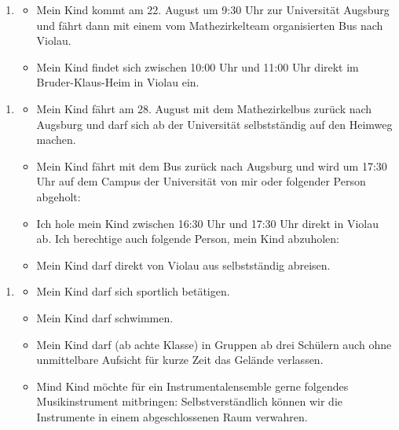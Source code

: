 \documentclass[13pt]{zettel}
\newenvironment{themabox}[1]{%
  \vspace{-0.8em}%
  \begin{enumerate}[labelindent=0pt,labelwidth=2.35cm,itemindent=0em,leftmargin=!,align=left]
    \item[\textbf{#1}]
      \begin{itemize}
}{\end{itemize}\end{enumerate}\vspace{-0.3em}}
\begin{document}
\newpage
\vspace*{-1.5cm}
\enlargethispage{1.0cm}
\small
\singlespacing

\begin{shaded}\begin{themabox}{Anreise}
\item Mein Kind kommt am 22. August um 9:30 Uhr zur Universität Augsburg und fährt dann mit einem vom Mathezirkelteam organisierten Bus nach Violau.
\item Mein Kind findet sich zwischen 10:00 Uhr und 11:00 Uhr direkt im Bruder-Klaus-Heim in Violau ein.
\end{themabox}
\end{shaded}
\vspace{-0.5cm}

\begin{shaded}\begin{themabox}{Abreise}
\item Mein Kind fährt am 28. August mit dem Mathezirkelbus zurück nach Augsburg und darf sich ab der Universität selbstständig auf den Heimweg machen.
\item Mein Kind fährt mit dem Bus zurück nach Augsburg und wird um 17:30 Uhr auf dem Campus der Universität von mir oder folgender Person abgeholt:
\\[0.3cm] \freist{13cm}
\item Ich hole mein Kind zwischen 16:30 Uhr und 17:30 Uhr direkt in Violau ab. Ich berechtige auch folgende Person, mein Kind abzuholen:
\\[0.3cm] \freist{13cm}
\item Mein Kind darf direkt von Violau aus selbstständig abreisen.
\end{themabox}
\end{shaded}

\vspace{-0.5cm}
\begin{shaded}\begin{themabox}{Aktivitäten}
\item Mein Kind darf sich sportlich betätigen.
\item Mein Kind darf schwimmen.
\item Mein Kind darf (ab achte Klasse) in Gruppen ab drei Schülern
auch ohne unmittelbare Aufsicht für kurze Zeit das Gelände verlassen.
\item Mind Kind möchte für ein Instrumentalensemble gerne folgendes Musikinstrument mitbringen:
\freist{7cm} Selbstverständlich können wir die Instrumente in einem
abgeschlossenen Raum verwahren.
\end{themabox}
\end{shaded}
\vspace{-0.5cm}
\end{document}
